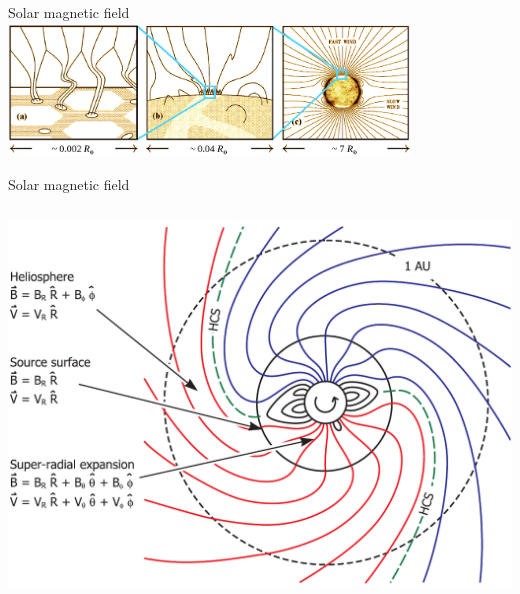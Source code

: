 \begin{frame}[plain,c]{Solar magnetic field}{}
	\includegraphics[width=0.8\textwidth]{../figures_of_others/images/Cranmer2005_fig1_color.png}
\end{frame}
\begin{frame}[plain,c]{Solar magnetic field}{}
	\begin{columns}[c]

	\includegraphics[width=\textwidth]{../figures_of_others/images/Owens2013_PFSS_Sectors_screenshot.png}
	
	
	\end{columns}
\end{frame}
